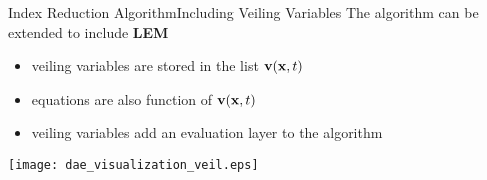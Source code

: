 \begin{frame}{Index Reduction Algorithm}{Including Veiling Variables}
  \vspace{-1.0em}
  The algorithm can be extended to include \textbf{\acs{LEM}}
  \begin{itemize}
    \item veiling variables are stored in the list $\mathbf{v}(\mathbf{x}, t)$
    \item equations are also function of $\mathbf{v}(\mathbf{x}, t)$
    \item veiling variables add an evaluation layer to the algorithm
  \end{itemize}
  \vspace{-1.5em}\hspace{-0.025\textwidth}\texttt{[image: dae\_visualization\_veil.eps]}
\end{frame}


